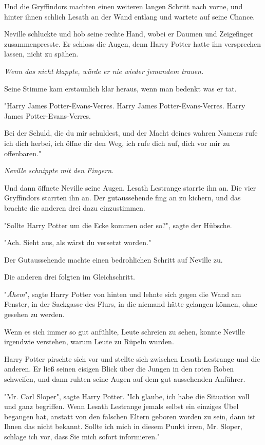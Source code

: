 {Und die Gryffindors machten einen weiteren langen Schritt nach vorne, und hinter ihnen schlich Lesath an der Wand entlang und wartete auf seine Chance.

Neville schluckte und hob seine rechte Hand, wobei er Daumen und Zeigefinger zusammenpresste. Er schloss die Augen, denn Harry Potter hatte ihn versprechen lassen, nicht zu spähen.

\emph{Wenn das nicht klappte, würde er nie wieder jemandem trauen.}

Seine Stimme kam erstaunlich klar heraus, wenn man bedenkt was er tat.

"Harry James Potter-Evans-Verres. Harry James Potter-Evans-Verres. Harry James Potter-Evans-Verres.

Bei der Schuld, die du mir schuldest, und der Macht deines wahren Namens rufe ich dich herbei, ich öffne dir den Weg, ich rufe dich auf, dich vor mir zu offenbaren."

\emph{Neville schnippte mit den Fingern.}

Und dann öffnete Neville seine Augen. Lesath Lestrange starrte ihn an. Die vier Gryffindors starrten ihn an. Der gutaussehende fing an zu kichern, und das brachte die anderen drei dazu einzustimmen.

"Sollte Harry Potter um die Ecke kommen oder so?", sagte der Hübsche.

"Ach. Sieht aus, als wärst du versetzt worden."

Der Gutaussehende machte einen bedrohlichen Schritt auf Neville zu.

Die anderen drei folgten im Gleichschritt.

"\emph{Ähem}", sagte Harry Potter von hinten und lehnte sich gegen die Wand am Fenster, in der Sackgasse des Flurs, in die niemand hätte gelangen können, ohne gesehen zu werden.

Wenn es sich immer so gut anfühlte, Leute schreien zu sehen, konnte Neville irgendwie verstehen, warum Leute zu Rüpeln wurden.

Harry Potter pirschte sich vor und stellte sich zwischen Lesath Lestrange und die anderen. Er ließ seinen eisigen Blick über die Jungen in den roten Roben schweifen, und dann ruhten seine Augen auf dem gut aussehenden Anführer.

"Mr. Carl Sloper", sagte Harry Potter. "Ich glaube, ich habe die Situation voll und ganz begriffen. Wenn Lesath Lestrange jemals selbst ein einziges Übel begangen hat, anstatt von den falschen Eltern geboren worden zu sein, dann ist Ihnen das nicht bekannt. Sollte ich mich in diesem Punkt irren, Mr. Sloper, schlage ich vor, dass Sie mich sofort informieren."

}
